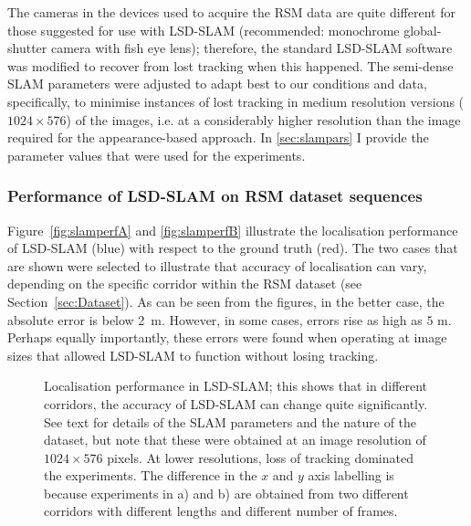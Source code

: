 The cameras in the devices used to acquire the RSM data are quite different for those suggested for use with LSD-SLAM (recommended: monochrome global-shutter camera with fish eye lens); therefore, the standard LSD-SLAM software was modified to recover from lost tracking when this happened. The semi-dense SLAM parameters were adjusted to adapt best to our conditions and data, specifically, to minimise instances of lost tracking in medium resolution versions ($1024 \times 576$) of the images, i.e. at a considerably higher resolution than the image required for the appearance-based approach. In \ref{sec:slampars} I provide the parameter values that were used for the experiments.


\subsubsection{Performance of LSD-SLAM on RSM dataset sequences}

Figure~\ref{fig:slamperfA} and \ref{fig:slamperfB} illustrate the localisation performance of LSD-SLAM (blue) with respect to the ground truth (red). The two cases that are shown were selected to illustrate that accuracy of localisation can vary, depending on the specific corridor within the RSM dataset (see Section~\ref{sec:Dataset}). As can be seen from the figures, in the better case, the absolute error is below \SI{2}{\metre}. However, in some cases, errors rise as high as $5$ m. Perhaps equally importantly, these errors were found when operating at image sizes that allowed LSD-SLAM to function without losing tracking.

\begin{figure}
	\centering
	\quad
	\caption{Localisation performance in LSD-SLAM; this shows that in different corridors, the accuracy of LSD-SLAM can change quite significantly. See text for details of the SLAM parameters and the nature of the dataset, but note that these were obtained at an image resolution of $1024 \times 576$ pixels. At lower resolutions, loss of tracking dominated the experiments. The difference in the $x$ and $y$ axis labelling is because experiments in a) and b) are obtained from two different corridors with different lengths and different number of frames.}
	\label{fig:slamperf}
\end{figure}


